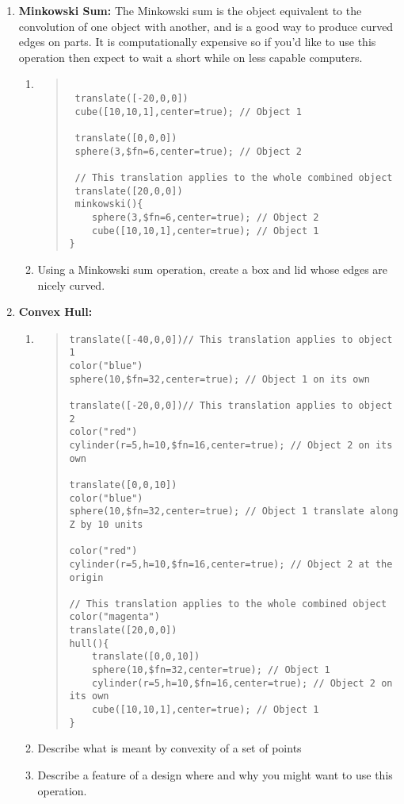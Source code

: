 \begin{enumerate}
 \item \textbf{Minkowski Sum: } The Minkowski sum is the object equivalent to the convolution of one object with another, and is a good way to produce curved edges on parts. It is computationally expensive so if you'd like to use this operation then expect to wait a short while on less capable computers. 
 \begin{enumerate}
 \item[ ]
 \begin{quote}
 \begin{verbatim}
 
 translate([-20,0,0])
 cube([10,10,1],center=true); // Object 1
 
 translate([0,0,0])
 sphere(3,$fn=6,center=true); // Object 2
 
 // This translation applies to the whole combined object
 translate([20,0,0])
 minkowski(){
	sphere(3,$fn=6,center=true); // Object 2
	cube([10,10,1],center=true); // Object 1
}

 \end{verbatim}
\end{quote}
\item Using a Minkowski sum operation, create a box and lid whose edges are nicely curved. 
\end{enumerate}
\item \textbf{Convex Hull: }
\begin{enumerate}
 \item[ ]
 \begin{quote}
 \begin{verbatim}
translate([-40,0,0])// This translation applies to object 1
color("blue") 
sphere(10,$fn=32,center=true); // Object 1 on its own

translate([-20,0,0])// This translation applies to object 2
color("red") 
cylinder(r=5,h=10,$fn=16,center=true); // Object 2 on its own

translate([0,0,10])
color("blue") 
sphere(10,$fn=32,center=true); // Object 1 translate along Z by 10 units

color("red") 
cylinder(r=5,h=10,$fn=16,center=true); // Object 2 at the origin

// This translation applies to the whole combined object
color("magenta") 
translate([20,0,0])
hull(){
	translate([0,0,10])
	sphere(10,$fn=32,center=true); // Object 1
	cylinder(r=5,h=10,$fn=16,center=true); // Object 2 on its own
	cube([10,10,1],center=true); // Object 1
}
 \end{verbatim}
\end{quote}
\item Describe what is meant by convexity of a set of points 
\item Describe a feature of a design where and why you might want to use this operation. 
 \end{enumerate}
\end{enumerate}





